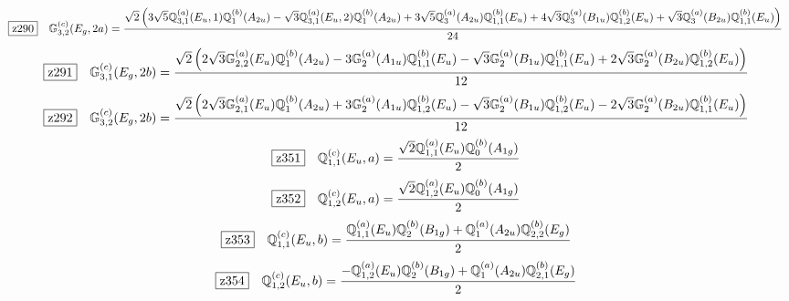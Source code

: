 \documentclass[fleqn,10pt,landscape]{jsarticle}
\begin{document}
\begin{dmath*}
\hspace*{3mm}\fbox{z290}\quad \mathbb{G}_{3,2}^{(c)}(E_{g},2a)=\frac{\sqrt{2} \left(3 \sqrt{5} \mathbb{Q}_{3,1}^{(a)}(E_{u},1) \mathbb{Q}_{1}^{(b)}(A_{2u}) - \sqrt{3} \mathbb{Q}_{3,1}^{(a)}(E_{u},2) \mathbb{Q}_{1}^{(b)}(A_{2u}) + 3 \sqrt{5} \mathbb{Q}_{3}^{(a)}(A_{2u}) \mathbb{Q}_{1,1}^{(b)}(E_{u}) + 4 \sqrt{3} \mathbb{Q}_{3}^{(a)}(B_{1u}) \mathbb{Q}_{1,2}^{(b)}(E_{u}) + \sqrt{3} \mathbb{Q}_{3}^{(a)}(B_{2u}) \mathbb{Q}_{1,1}^{(b)}(E_{u})\right)}{24}
\end{dmath*}
\begin{dmath*}
\hspace*{3mm}\fbox{z291}\quad \mathbb{G}_{3,1}^{(c)}(E_{g},2b)=\frac{\sqrt{2} \left(2 \sqrt{3} \mathbb{G}_{2,2}^{(a)}(E_{u}) \mathbb{Q}_{1}^{(b)}(A_{2u}) - 3 \mathbb{G}_{2}^{(a)}(A_{1u}) \mathbb{Q}_{1,1}^{(b)}(E_{u}) - \sqrt{3} \mathbb{G}_{2}^{(a)}(B_{1u}) \mathbb{Q}_{1,1}^{(b)}(E_{u}) + 2 \sqrt{3} \mathbb{G}_{2}^{(a)}(B_{2u}) \mathbb{Q}_{1,2}^{(b)}(E_{u})\right)}{12}
\end{dmath*}
\begin{dmath*}
\hspace*{3mm}\fbox{z292}\quad \mathbb{G}_{3,2}^{(c)}(E_{g},2b)=\frac{\sqrt{2} \left(2 \sqrt{3} \mathbb{G}_{2,1}^{(a)}(E_{u}) \mathbb{Q}_{1}^{(b)}(A_{2u}) + 3 \mathbb{G}_{2}^{(a)}(A_{1u}) \mathbb{Q}_{1,2}^{(b)}(E_{u}) - \sqrt{3} \mathbb{G}_{2}^{(a)}(B_{1u}) \mathbb{Q}_{1,2}^{(b)}(E_{u}) - 2 \sqrt{3} \mathbb{G}_{2}^{(a)}(B_{2u}) \mathbb{Q}_{1,1}^{(b)}(E_{u})\right)}{12}
\end{dmath*}
\begin{dmath*}
\hspace*{3mm}\fbox{z351}\quad \mathbb{Q}_{1,1}^{(c)}(E_{u},a)=\frac{\sqrt{2} \mathbb{Q}_{1,1}^{(a)}(E_{u}) \mathbb{Q}_{0}^{(b)}(A_{1g})}{2}
\end{dmath*}
\begin{dmath*}
\hspace*{3mm}\fbox{z352}\quad \mathbb{Q}_{1,2}^{(c)}(E_{u},a)=\frac{\sqrt{2} \mathbb{Q}_{1,2}^{(a)}(E_{u}) \mathbb{Q}_{0}^{(b)}(A_{1g})}{2}
\end{dmath*}
\begin{dmath*}
\hspace*{3mm}\fbox{z353}\quad \mathbb{Q}_{1,1}^{(c)}(E_{u},b)=\frac{\mathbb{Q}_{1,1}^{(a)}(E_{u}) \mathbb{Q}_{2}^{(b)}(B_{1g}) + \mathbb{Q}_{1}^{(a)}(A_{2u}) \mathbb{Q}_{2,2}^{(b)}(E_{g})}{2}
\end{dmath*}
\begin{dmath*}
\hspace*{3mm}\fbox{z354}\quad \mathbb{Q}_{1,2}^{(c)}(E_{u},b)=\frac{- \mathbb{Q}_{1,2}^{(a)}(E_{u}) \mathbb{Q}_{2}^{(b)}(B_{1g}) + \mathbb{Q}_{1}^{(a)}(A_{2u}) \mathbb{Q}_{2,1}^{(b)}(E_{g})}{2}
\end{dmath*}
\end{document}
